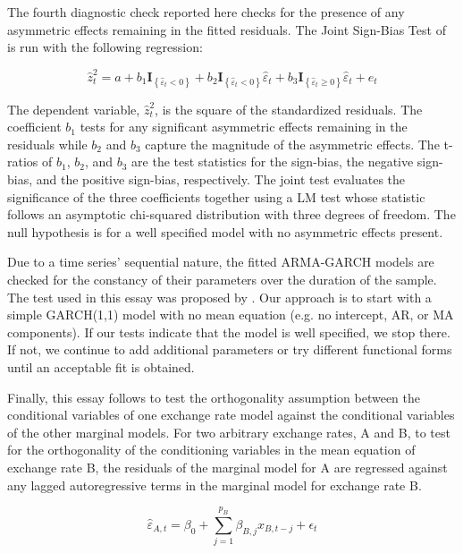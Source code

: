 \documentclass[12pt]{article}
\begin{document}
The fourth diagnostic check reported here checks for the presence of any asymmetric effects remaining in the fitted residuals. The Joint Sign-Bias Test of \cite{Engle_Ng_1993} is run with the following regression:

\begin{equation}
	\hat{z}_{t}^{2} = a + b_{1} \mathbf{I}_{\left\{\hat{\varepsilon}_{t} < 0 \right\}} + b_{2} \mathbf{I}_{\left\{\hat{\varepsilon}_{t} < 0 \right\}} \hat{\varepsilon}_{t} + b_{3} \mathbf{I}_{\left\{\hat{\varepsilon}_{t} \geq 0 \right\}} \hat{\varepsilon}_{t} + e_{t}
\end{equation}

The dependent variable, $\hat{z}_{t}^{2}$, is the square of the standardized residuals. The coefficient $b_{1}$ tests for any significant asymmetric effects remaining in the residuals while $b_{2}$ and $b_{3}$ capture the magnitude of the asymmetric effects. The t-ratios of $b_{1}$, $b_{2}$, and $b_{3}$ are the test statistics for the sign-bias, the negative sign-bias, and the positive sign-bias, respectively. The joint test evaluates the significance of the three coefficients together using a LM test whose statistic follows an asymptotic chi-squared distribution with three degrees of freedom. The null hypothesis is for a well specified model with no asymmetric effects present.

Due to a time series' sequential nature, the fitted ARMA-GARCH models are checked for the constancy of their parameters over the duration of the sample. The test used in this essay was proposed by \cite{NYBLOM_1989}. Our approach is to start with a simple GARCH(1,1) model with no mean equation (e.g. no intercept, AR, or MA components). If our tests indicate that the model is well specified, we stop there. If not, we continue to add additional parameters or try different functional forms until an acceptable fit is obtained.

Finally, this essay follows \cite{Patton_2006} to test the orthogonality assumption between the conditional variables of one exchange rate model against the conditional variables of the other marginal models. For two arbitrary exchange rates, A and B, to test for the orthogonality of the conditioning variables in the mean equation of exchange rate B, the residuals of the marginal model for A are regressed against any lagged autoregressive terms in the marginal model for exchange rate B.

\begin{equation} \label{eq:mean_orthogonality_assumption}
	\hat{\varepsilon}_{A, t} = \beta_{0} + \sum_{j=1}^{p_{B}}\beta_{B,j} x_{B, t-j} + \epsilon_{t}
\end{equation}
\end{document}
